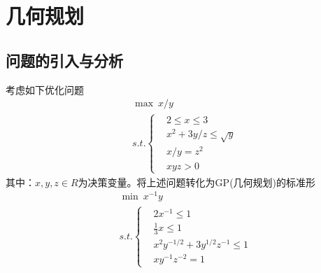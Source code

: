 % 
\chapter{几何规划}
\section{问题的引入与分析}
    \par
    考虑如下优化问题
    \begin{align*}
    &\mathop{\max}\  x/y\\
    &s.t.  \left\{
    \begin{aligned}
    &2\leqslant x\leqslant 3\\
    &x^2+3y/z\leqslant \sqrt{y}\\
    &x/y=z^2\\
    &xyz>0
    \end{aligned}
        \right.
    \end{align*}
    其中：$x,y,z\in R$为决策变量。将上述问题转化为GP(几何规划)的标准形
    \begin{align*}
    &\mathop{\min}\  x^{-1}y\\
    &s.t.  \left\{
    \begin{aligned}
    &2x^{-1}\leqslant 1\\
    &\frac 13 x\leqslant 1\\
    &x^2y^{-1/2}+3y^{1/2}z^{-1}\leqslant 1\\
    &xy^{-1}z^{-2}=1
    \end{aligned}
    \right.
    \end{align*}
